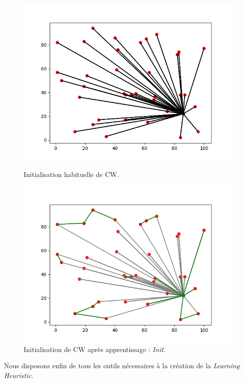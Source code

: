 \documentclass[a4paper,11pt]{article}%
\begin{document}
\begin{figure}[h!]
    \begin{minipage}[c]{.46\linewidth}
        \centering
        \includegraphics[scale=0.4]{CWinit.png}
        \caption{Initialisation habituelle de CW.}
    \end{minipage}
    \hfill%
    \begin{minipage}[c]{.46\linewidth}
        \centering
        \includegraphics[scale=0.4]{learning.png}
        \caption{Initialisation de CW après apprentissage : \emph{Init}.}
        \label{newInit}
    \end{minipage}
\end{figure}

Nous disposons enfin de tous les outils nécessaires à la création de la \emph{Learning Heuristic}.
\end{document}
